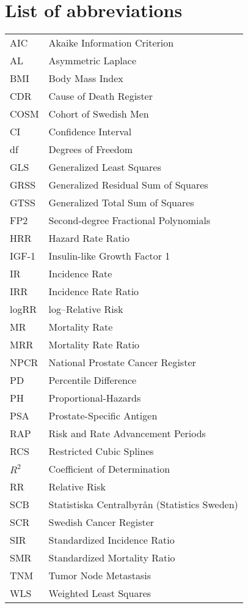 %

\chapter*{List of abbreviations}
\begin{tabular}{ll}

AIC & Akaike Information Criterion \\
AL & Asymmetric Laplace  \\
BMI & Body Mass Index \\
CDR & Cause of Death Register \\
COSM & Cohort of Swedish Men \\
CI & Confidence Interval \\
df & Degrees of Freedom \\
GLS & Generalized Least Squares \\
GRSS & Generalized Residual Sum of Squares \\
GTSS & Generalized Total Sum of Squares \\
FP2 & Second-degree Fractional Polynomials \\
HRR & Hazard Rate Ratio \\
IGF-1 & Insulin-like Growth Factor 1 \\
IR & Incidence Rate \\
IRR & Incidence Rate Ratio \\
logRR & log--Relative Risk \\
MR & Mortality Rate \\
MRR & Mortality Rate Ratio \\
NPCR & National Prostate Cancer Register \\
PD & Percentile Difference \\
PH & Proportional-Hazards \\
PSA & Prostate-Specific Antigen \\
RAP & Risk and Rate Advancement Periods \\
RCS & Restricted Cubic Splines \\
$R^2$ & Coefficient of Determination \\
RR & Relative Risk \\
SCB & Statistiska Centralbyrån (Statistics Sweden) \\
SCR & Swedish Cancer Register \\
SIR & Standardized Incidence Ratio \\
SMR & Standardized Mortality Ratio \\
TNM & Tumor Node Metastasis \\
WLS & Weighted Least Squares


\end{tabular}